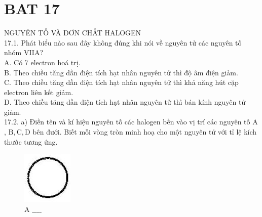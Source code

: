 \documentclass[10pt]{article}
\begin{document}
\section*{BAT 17}
NGUYÊN TỐ VÀ DƠN CHẤT HALOGEN\\
17.1. Phát biểu nào sau đây không đúng khi nói về nguyên tử các nguyên tố nhóm VIIA?\\
A. Có 7 electron hoá trị.\\
B. Theo chiều tăng dần điện tích hạt nhân nguyên tử thì độ âm điện giảm.\\
C. Theo chiều tăng dần điện tích hạt nhân nguyên tử thì khả năng hút cặp electron liên kết giảm.\\
D. Theo chiều tăng dần điện tích hạt nhân nguyên tử thì bán kính nguyên tử giảm.\\
17.2. a) Điền tên và kí hiệu nguyên tố các halogen bền vào vị trí các nguyên tố A , $\mathrm{B}, \mathrm{C}, \mathrm{D}$ bên đưới. Biết mỗi vòng tròn minh hoạ cho một nguyên tử với tỉ lệ kích thước tương ứng.

\begin{figure}[h]
\begin{center}
  \includegraphics[width=\textwidth]{2025_10_23_76620c17ffac1ae9b35bg-54(1)}
\captionsetup{labelformat=empty}
\caption{A $\_\_\_\_$}
\end{center}
\end{figure}
\end{document}
